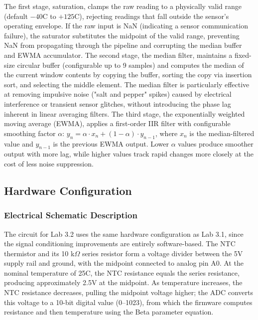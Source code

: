 The first stage, saturation, clamps the raw reading to a physically valid range (default $-40$\textdegree C to $+125$\textdegree C), rejecting readings that fall outside the sensor's operating envelope. If the raw input is NaN (indicating a sensor communication failure), the saturator substitutes the midpoint of the valid range, preventing NaN from propagating through the pipeline and corrupting the median buffer and EWMA accumulator. The second stage, the median filter, maintains a fixed-size circular buffer (configurable up to 9 samples) and computes the median of the current window contents by copying the buffer, sorting the copy via insertion sort, and selecting the middle element. The median filter is particularly effective at removing impulsive noise ("salt and pepper" spikes) caused by electrical interference or transient sensor glitches, without introducing the phase lag inherent in linear averaging filters. The third stage, the exponentially weighted moving average (EWMA), applies a first-order IIR filter with configurable smoothing factor $\alpha$: $y_n = \alpha \cdot x_n + (1-\alpha) \cdot y_{n-1}$, where $x_n$ is the median-filtered value and $y_{n-1}$ is the previous EWMA output. Lower $\alpha$ values produce smoother output with more lag, while higher values track rapid changes more closely at the cost of less noise suppression.

\subsection{Hardware Configuration}

\subsubsection{Electrical Schematic Description}

The circuit for Lab 3.2 uses the same hardware configuration as Lab 3.1, since the signal conditioning improvements are entirely software-based. The NTC thermistor and its 10 k$\Omega$ series resistor form a voltage divider between the 5V supply rail and ground, with the midpoint connected to analog pin A0. At the nominal temperature of 25\textdegree C, the NTC resistance equals the series resistance, producing approximately 2.5V at the midpoint. As temperature increases, the NTC resistance decreases, pulling the midpoint voltage higher; the ADC converts this voltage to a 10-bit digital value (0--1023), from which the firmware computes resistance and then temperature using the Beta parameter equation.


